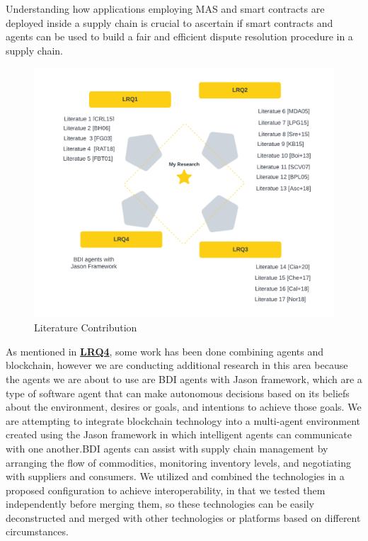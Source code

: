 \vspace{.5cm}

Understanding how applications employing \ac{MAS} and smart contracts are deployed inside a supply chain is crucial to ascertain if smart contracts and agents can be used to build a fair and efficient dispute resolution procedure in a supply chain. 

\vspace{.5cm}

\begin{figure}[h]
\centering
  \includegraphics[width=13cm]{includes/figures/related work.png} 
  \caption{Literature Contribution}
  \label{related work}
\end{figure}

As mentioned in \hyperref[LRQ4.]{\textbf{LRQ4}}, some work has been done combining agents and blockchain, however we are conducting additional research in this area because the agents we are about to use are \ac{BDI} agents with Jason framework, which are a type of software agent that can make autonomous decisions based on its beliefs about the environment, desires or goals, and intentions to achieve those goals. We are attempting to integrate blockchain technology into a multi-agent environment created using the Jason framework in which intelligent agents can communicate with one another.\ac{BDI} agents can assist with supply chain management by arranging the flow of commodities, monitoring inventory levels, and negotiating with suppliers and consumers. We utilized and combined the technologies in a proposed configuration to achieve interoperability, in that we tested them independently before merging them, so these technologies can be easily deconstructed and merged with other technologies or platforms based on different circumstances.

